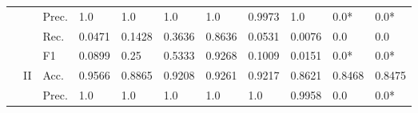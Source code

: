 \begin{tabular}{cclllllllll}
    \multicolumn{1}{l}{}                                                                                       &                                   & Prec.                                                & 1.0                     & 1.0                     & 1.0                          & 1.0                     & 0.9973                                                                       & 1.0                                                                         & 0.0*                                      & 0.0*                                      \\
    \multicolumn{1}{l}{}                                                                                       &                                   & Rec.                                                 & 0.0471                  & 0.1428                  & 0.3636                       & 0.8636                  & 0.0531                                                                       & 0.0076                                                                      & 0.0                                       & 0.0                                       \\
    \multicolumn{1}{l}{}                                                                                       &                                   & F1                                                   & 0.0899                  & 0.25                    & 0.5333                       & 0.9268                  & 0.1009                                                                       & 0.0151                                                                      & 0.0*                                      & 0.0*                                      \\ 
    \cmidrule{2-11}
    \multicolumn{1}{l}{}                                                                                       & \multirow{4}{*}{II}               & Acc.                                                 & 0.9566                  & 0.8865                  & 0.9208                       & 0.9261                  & 0.9217                                                                       & 0.8621                                                                      & 0.8468                                    & 0.8475                                    \\
    \multicolumn{1}{l}{}                                                                                       &                                   & Prec.                                                & 1.0                     & 1.0                     & 1.0                          & 1.0                     & 1.0                                                                          & 0.9958                                                                      & 0.0                                       & 0.0*                                      \\

\end{tabular}
